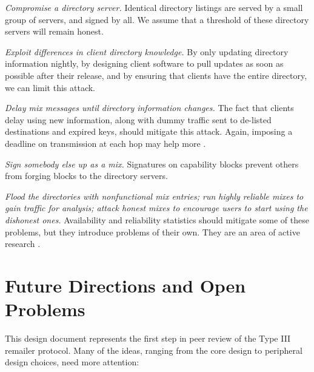 \documentclass[11pt]{IEEEtran}
\begin{document}
\begin{description}
\item \emph{Compromise a directory server.} Identical directory listings
are served by a small group of servers, and signed by all. We assume
that a threshold of these directory servers will remain honest.
\item \emph{Exploit differences in client directory knowledge.} By only
updating directory information nightly, by designing client software to
pull updates as soon as possible after their release, and by ensuring
that clients have the entire directory, we can limit this attack.
\item \emph{Delay mix messages until directory information changes.}
The fact that clients delay using new information, along with dummy
traffic sent to de-listed destinations and expired keys, should mitigate
this attack. Again, imposing a deadline on transmission at each hop
may help more \cite{mix-acc}.
\item \emph{Sign somebody else up as a mix.}  Signatures on capability
blocks prevent others from forging blocks to the directory servers.
\item \emph{Flood the directories with nonfunctional mix entries; run
highly reliable mixes to gain traffic for analysis; attack honest mixes
to encourage users to start using the dishonest ones.}
Availability and reliability statistics should mitigate some of these
problems, but they introduce problems of their own. They are an area of
active research \cite{mix-acc}\cite{casc-rep}.
\end{description}


\section{Future Directions and Open Problems}
\label{sec:conclusion}

This design document represents the first step in peer review of the
Type III remailer protocol. Many of the ideas, ranging from the core
design to peripheral design choices, need more attention:
\end{document}
